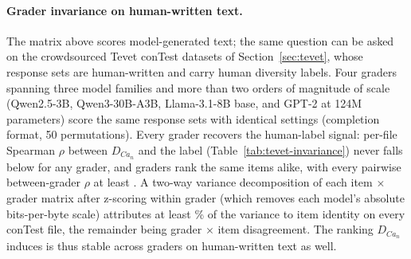\paragraph{Grader invariance on human-written text.}
The matrix above scores model-generated text; the same question can be asked on the crowdsourced Tevet conTest datasets of Section~\ref{sec:tevet}, whose response sets are human-written and carry human diversity labels.
Four graders spanning three model families and more than two orders of magnitude of scale (Qwen2.5-3B, Qwen3-30B-A3B, Llama-3.1-8B base, and GPT-2 at 124M parameters) score the same response sets with identical settings (completion format, 50 permutations).
Every grader recovers the human-label signal: per-file Spearman $\rho$ between $D_{Ca_n}$ and the label (Table~\ref{tab:tevet-invariance}) never falls below \tevetInvMinRho{} for any grader, and graders rank the same items alike, with every pairwise between-grader $\rho$ at least \tevetInvMinPairRho{}.
A two-way variance decomposition of each item $\times$ grader matrix after z-scoring within grader (which removes each model's absolute bits-per-byte scale) attributes at least \tevetInvMinItemPct\% of the variance to item identity on every conTest file, the remainder being grader $\times$ item disagreement.
The ranking $D_{Ca_n}$ induces is thus stable across graders on human-written text as well.

\begin{table}[h]
\centering
\caption{Grader invariance on the Tevet conTest datasets. Rows: Spearman $\rho$ between per-item $D_{Ca_n}$ and the human diversity label, per grader $\theta$, on the common item subset of each conTest file. Last row: share of within-grader z-scored variance attributable to item identity in a two-way item $\times$ grader decomposition.}
\label{tab:tevet-invariance}
\small
{}
\end{table}

